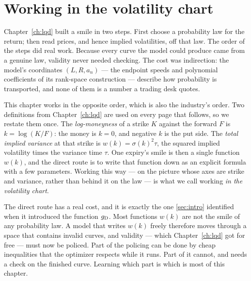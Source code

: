 \section{Working in the volatility chart}
\label{sec:svichart}

Chapter~\ref{ch:lqd} built a smile in two steps.  First choose a
probability law for the return; then read prices, and hence implied
volatilities, off that law.  The order of the steps did real work.
Because every curve the model could produce came from a genuine law,
validity never needed checking.  The cost was indirection: the model's
coordinates $(L,R,a_n)$ --- the endpoint speeds and polynomial
coefficients of its rank-space construction --- describe how probability
is transported, and none of them is a number a trading desk quotes.

This chapter works in the opposite order, which is also the industry's
order.  Two definitions from Chapter~\ref{ch:lqd} are used on every page
that follows, so we restate them once.  The \emph{log-moneyness} of a
strike $K$ against the forward $F$ is $k=\log(K/F)$: the money is $k=0$,
and negative $k$ is the put side.  The \emph{total implied variance} at
that strike is $w(k)=\sigma(k)^2\tau$, the squared implied volatility
times the variance time $\tau$.  One expiry's smile is then a single
function $w(k)$, and the direct route is to write that function down as
an explicit formula with a few parameters.  Working this way --- on the
picture whose axes are strike and variance, rather than behind it on the
law --- is what we call working \emph{in the volatility chart}.

The direct route has a real cost, and it is exactly the one
\cref{sec:intro} identified when it introduced the function $g_{\rm D}$.
Most functions $w(k)$ are not the smile of any probability law.  A model
that writes $w(k)$ freely therefore moves through a space that contains
invalid curves, and validity --- which Chapter~\ref{ch:lqd} got for free
--- must now be policed.  Part of the policing can be done by cheap
inequalities that the optimizer respects while it runs.  Part of it
cannot, and needs a check on the finished curve.  Learning which part is
which is most of this chapter.

